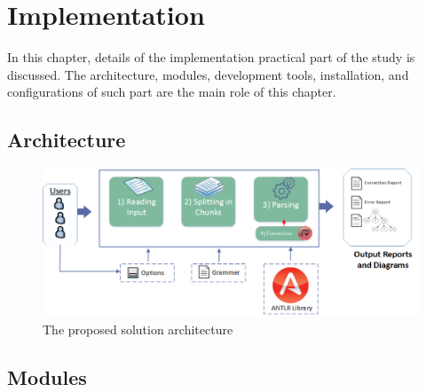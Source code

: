 \chapter{Implementation}
\label{ch:implementation}


In this chapter, details of the implementation practical part of the study is discussed. The architecture, modules, development tools, installation, and configurations of such part are the main role of this chapter.    
\section {Architecture}
	\begin{figure}[ht]
	\begin{center}
		\includegraphics[scale=0.5,angle=0]{images/Architecture}
		\caption{The proposed solution architecture}
		\label{Fig:Architecture}
	\end{center}
\end{figure}
\section {Modules} 












